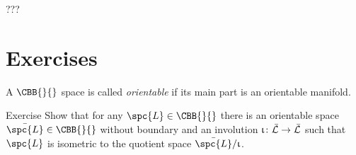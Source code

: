 ???\qeds



\section{Exercises}

A $\CBB{}{}$ space is called \emph{orientable} if its main part is an orientable manifold.

\begin{thm}{Exercise}
Show that for any $\spc{L}\in\CBB{}{}$ there is an orientable space $\bar{\spc{L}}\in\CBB{}{}$ without boundary and an involution $\iota\:\bar{\spc{L}}\to\bar{\spc{L}}$
such that $\spc{L}$ is isometric to the quotient space $\bar{\spc{L}}/\iota$.
\end{thm}



